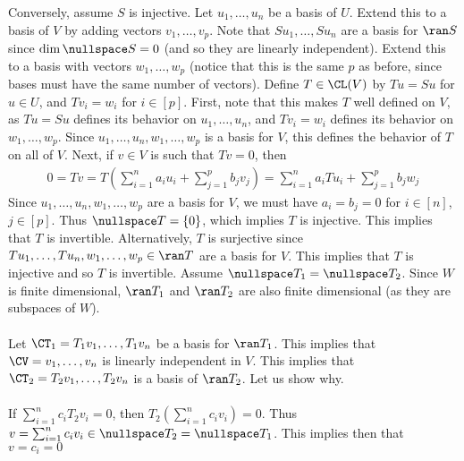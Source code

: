 \documentclass{book}
\begin{document}
\begin{enumerate}[label=\arabic*)]
      Conversely, assume $S$ is injective. Let $u_1, \dots, u_n$ be a basis of $U$. Extend this to a basis of $V$ by adding vectors $v_1, \dots, v_p$. Note that $Su_1, \dots, Su_n$ are a
      basis for $\ran S$ since $\dim\nullspace S = 0$ (and so they are linearly independent). Extend this to a basis with vectors $w_1, \dots, w_p$ (notice that this is the same $p$ as before,
      since bases must have the same number of vectors). Define $T \in \CL(V)$ by $Tu = Su$ for $u \in U$, and $Tv_i = w_i$ for $i \in [p]$. First, note that this makes $T$ well defined on
      $V$, as $Tu = Su$ defines its behavior on $u_1, \dots, u_n$, and $Tv_i = w_i$ defines its behavior on $w_1, \dots, w_p$. Since $u_1, \dots, u_n, w_1, \dots, w_p$ is a basis for $V$,
      this defines the behavior of $T$ on all of $V$. Next, if $v \in V$ is such that $Tv = 0$, then
      \begin{align*}
        0 = Tv = T(\sum_{i = 1}^{n}a_iu_i + \sum_{j = 1}^{p}b_jv_j) = \sum_{i = 1}^{n}a_iTu_i + \sum_{j = 1}^{p}b_jw_j
      \end{align*}
      Since $u_1, \dots, u_n, w_1, \dots, w_p$ are a basis for $V$, we must have $a_i = b_j = 0$ for $i \in [n]$, $j \in [p]$. Thus $\nullspace T = \{0\}$, which implies $T$ is injective.
      This implies that $T$ is invertible. Alternatively, $T$ is surjective since $Tu_1, \dots, Tu_n, w_1, \dots, w_p \in \ran T$ are a basis for $V$. This implies that $T$ is injective and
      so $T$ is invertible.
    \ii
      Assume $\nullspace T_1 = \nullspace T_2$. Since $W$ is finite dimensional, $\ran T_1$ and $\ran T_2$ are also finite dimensional (as they are subspaces of $W$). 
      \\~\\
      Let $\CT_1 = T_1v_1, \dots, T_1v_n$ be a basis for $\ran T_1$. This implies that $\CV = v_1, \dots, v_n$ is linearly independent in $V$. This implies that $\CT_2 = T_2v_1, \dots,
      T_2v_n$ is a basis of $\ran T_2$. Let us show why. 
      \\~\\
      If $\sum_{i = 1}^{n}c_iT_2v_i = 0$, then $T_2(\sum_{i = 1}^{n}c_iv_i) = 0$. Thus $v = \sum_{i = 1}^{n}c_iv_i \in \nullspace T_2 = \nullspace T_1$. This implies then that $v = c_i = 0$

\end{enumerate}
\end{document}
